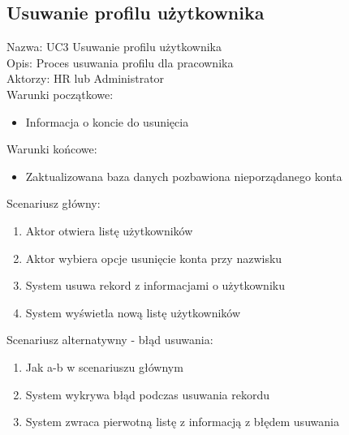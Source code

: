\subsection{Usuwanie profilu użytkownika}
\begin{adjustwidth}{5em}{0pt}
Nazwa: UC3 Usuwanie profilu użytkownika \\
Opis: Proces usuwania profilu dla pracownika \\
Aktorzy: HR lub Administrator \\
Warunki początkowe:
\begin{itemize}
\item Informacja o koncie do usunięcia
\end{itemize}
Warunki końcowe: 
\begin{itemize}
\item Zaktualizowana baza danych pozbawiona nieporządanego konta
\end{itemize}
Scenariusz główny:
\begin{enumerate}
\item Aktor otwiera listę użytkowników
\item Aktor wybiera opcje usunięcie konta przy nazwisku
\item System usuwa rekord z informacjami o użytkowniku
\item System wyświetla nową listę użytkowników
\end{enumerate}
Scenariusz alternatywny - błąd usuwania: 
\begin{enumerate}
\item Jak a-b w scenariuszu głównym
\item System wykrywa błąd podczas usuwania rekordu
\item System zwraca pierwotną listę z informacją z błędem usuwania
\end{enumerate}
\end{adjustwidth}

